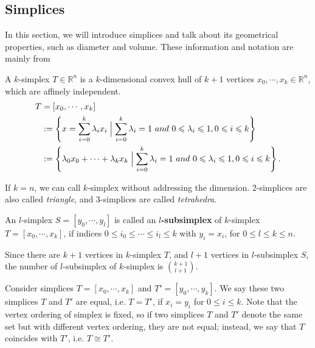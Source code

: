     \subsection{Simplices}
    In this section, we will introduce simplices and talk about its geometrical properties, such as diameter and volume. These information and notation are mainly from \cite{ciarlet2002finite}\cite{bey2000simplicial}
    \noindent
    \begin{definition*}
    A $k$-simplex $T \in \mathbb{R}^n$ is a $k$-dimensional convex hull of $k+1$ vertices ${x}_0, \cdots, {x}_k \in \mathbb{R}^n$, which are affinely independent.
    \begin{equation*}
    \begin{split}
    {T} & = [{x}_0, \cdots, {x}_k ]\\
    & := \left\{{x} = \sum\limits_{i=0}^k \lambda_i {x}_i \Bigm| \sum\limits_{i=0}^k \lambda_i = 1 ~and~ 0 \leqslant \lambda_i \leqslant 1, 0 \leqslant i \leqslant k \right\}\\
    & := \left\{\lambda_0{x}_0 + \cdots + \lambda_k{x}_k \Bigm| \sum\limits_{i=0}^k \lambda_i = 1 ~and~ 0 \leqslant \lambda_i \leqslant 1, 0 \leqslant i \leqslant k \right\}.
    \end{split}
    \end{equation*}
    \end{definition*}
    If $k = n$, we can call $k$-simplex without addressing the dimension. 2-simplices are also called \emph{triangle}, and 3-simplices are called \emph{tetrahedra}.

    \begin{definition*}
    An  $l$-simplex ${S} = [{y}_0, \cdots, {y}_l]$ is called an \textbf{$l$-subsimplex} of $k$-simplex ${T} = [{x}_0, \cdots, {x}_k]$, if indices $0 \leqslant {i}_0 \leqslant \cdots\leqslant{i}_l \leqslant k$ with ${y}_i = {x}_i$, for $0 \leqslant l \leqslant k \leqslant n$.
    \end{definition*}
    Since there are $k+1$ vertices in $k$-simplex $T$, and $l+1$ vertices in $l$-subsimplex $S$, the number of $l$-subsimplex of $k$-simplex is $\binom{k+1}{l+1}$.


    Consider simplices $T = [{x}_0, \cdots, {x}_k]$ and $T' = [{y}_0, \cdots, {y}_k]$. We say these two simplices $T$ and $T'$ are equal, i.e. $T = T'$, if ${x}_i = {y}_i$ for $0 \leqslant i \leqslant k$. Note that the vertex ordering of simplex is fixed, so if two simplices $T$ and $T'$ denote the same set but with different vertex ordering, they are not equal; instead, we say that ${T}$ coincides with $T'$, i.e. $T \cong T'$.


